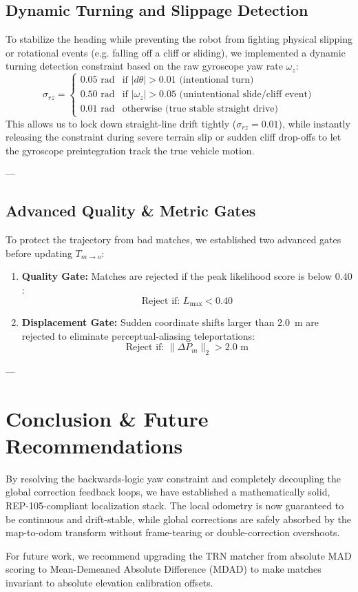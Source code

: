 \documentclass[10pt,journal,compsoc]{IEEEtran}
\begin{document}
\subsection{Dynamic Turning and Slippage Detection}
To stabilize the heading while preventing the robot from fighting physical slipping or rotational events (e.g. falling off a cliff or sliding), we implemented a dynamic turning detection constraint based on the raw gyroscope yaw rate $\omega_z$:
\begin{equation}
    \sigma_{rz} = \begin{cases} 
        0.05\text{ rad} & \text{if } |d\theta| > 0.01\text{ (intentional turn)} \\ 
        0.50\text{ rad} & \text{if } |\omega_z| > 0.05\text{ (unintentional slide/cliff event)} \\ 
        0.01\text{ rad} & \text{otherwise (true stable straight drive)} 
    \end{cases}
\end{equation}
This allows us to lock down straight-line drift tightly ($\sigma_{rz}=0.01$), while instantly releasing the constraint during severe terrain slip or sudden cliff drop-offs to let the gyroscope preintegration track the true vehicle motion.

---

\subsection{Advanced Quality \& Metric Gates}
To protect the trajectory from bad matches, we established two advanced gates before updating $T_{m \to o}$:
\begin{enumerate}
    \item \textbf{Quality Gate:} Matches are rejected if the peak likelihood score is below $0.40$:
    \begin{equation}
        \text{Reject if: } L_{\text{max}} < 0.40
    \end{equation}
    \item \textbf{Displacement Gate:} Sudden coordinate shifts larger than $2.0$~m are rejected to eliminate perceptual-aliasing teleportations:
    \begin{equation}
        \text{Reject if: } \| \Delta P_m \|_2 > 2.0\text{ m}
    \end{equation}
\end{enumerate}

---

\section{Conclusion \& Future Recommendations}
By resolving the backwards-logic yaw constraint and completely decoupling the global correction feedback loops, we have established a mathematically solid, REP-105-compliant localization stack. The local odometry is now guaranteed to be continuous and drift-stable, while global corrections are safely absorbed by the map-to-odom transform without frame-tearing or double-correction overshoots.

For future work, we recommend upgrading the TRN matcher from absolute MAD scoring to Mean-Demeaned Absolute Difference (MDAD) to make matches invariant to absolute elevation calibration offsets.
\end{document}
